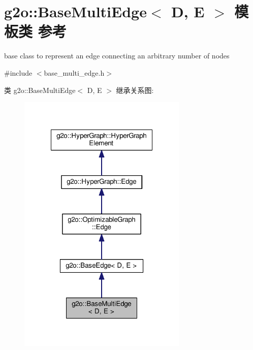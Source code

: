 \hypertarget{classg2o_1_1BaseMultiEdge}{\section{g2o\-:\-:Base\-Multi\-Edge$<$ D, E $>$ 模板类 参考}
\label{classg2o_1_1BaseMultiEdge}
}


base class to represent an edge connecting an arbitrary number of nodes  




{\ttfamily \#include $<$base\-\_\-multi\-\_\-edge.\-h$>$}



类 g2o\-:\-:Base\-Multi\-Edge$<$ D, E $>$ 继承关系图\-:
\nopagebreak
\begin{figure}[H]
\begin{center}
\leavevmode
\includegraphics[width=228pt]{classg2o_1_1BaseMultiEdge__inherit__graph}
\end{center}
\end{figure}


